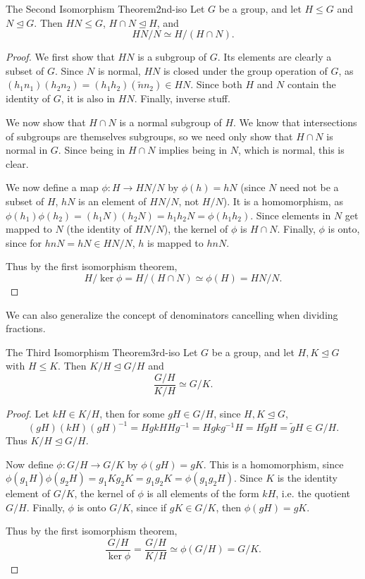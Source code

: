\documentclass[10pt]{report}
\begin{document}
\begin{thrm}{The Second Isomorphism Theorem}{2nd-iso}
Let $G$ be a group, and let $H \leq G$ and $N \trianglelefteq G$. Then $HN \leq G$, $H \cap N \trianglelefteq H$, and
\[
	HN/N \simeq H/(H \cap N).
\] 
\end{thrm}
\begin{proof}
	We first show that $HN$ is a subgroup of $G$. Its elements are clearly a subset of $G$. Since $N$ is normal, $HN$ is closed under the group operation of $G$, as $(h_1n_1)(h_2n_2) = (h_1h_2)(\tilde{n}n_2) \in HN$. Since both $H$ and $N$ contain the identity of $G$, it is also in $HN$. Finally, {\color{red}inverse stuff.}

	We now show that $H \cap N$ is a normal subgroup of $H$. We know that intersections of subgroups are themselves subgroups, so we need only show that $H \cap N$ is normal in $G$. Since being in $H \cap N$ implies being in $N$, which is normal, this is clear.

	We now define a map $\phi:H \to HN/N$ by $\phi(h)=hN$ (since $N$ need not be a subset of $H$, $hN$ is an element of $HN/N$, not $H/N$). It is a homomorphism, as $\phi(h_1)\phi(h_2) = (h_1N)(h_2N)=h_1h_2N = \phi(h_1h_2)$. Since elements in $N$ get mapped to $N$ (the identity of $HN/N$), the kernel of $\phi$ is $H\cap N$. Finally, $\phi$ is onto, since for $hnN=hN \in HN/N$, $h$ is mapped to $hnN$.

	Thus by the first isomorphism theorem,
	\[
		H/\ker \phi = H/(H\cap N) \simeq \phi(H) = HN/N.
	\] 
\end{proof}

We can also generalize the concept of denominators cancelling when dividing fractions.

\begin{thrm}{The Third Isomorphism Theorem}{3rd-iso}
Let $G$ be a group, and let $H,K \trianglelefteq G$ with $H \leq K$. Then $K/H \trianglelefteq  G/H$ and
\[
\frac{G/H}{K/H} \simeq G/K.
\] 
\end{thrm}
\begin{proof}
Let $kH \in K/H$, then for some $gH \in G/H$, since $H,K \trianglelefteq G$,
\[
	(gH)(kH)(gH)^{-1} = Hg kH Hg^{-1} = Hgkg^{-1}H = H\tilde{g}H = \tilde{g}H \in G/H.
\] Thus $K/H \trianglelefteq G/H$.

Now define $\phi:G/H \to G/K$ by $\phi(gH) = gK$. This is a homomorphism, since $\phi(g_1H)\phi(g_2H) = g_1Kg_2K = g_1g_2K = \phi(g_1g_2H)$. Since $K$ is the identity element of $G/K$, the kernel of $\phi$ is all elements of the form $kH$, i.e. the quotient $G/H$. Finally, $\phi$ is onto $G/K$, since if $gK \in G/K$, then $\phi(gH) = gK$.

Thus by the first isomorphism theorem,
\[
	\frac{G/H}{\ker \phi} = \frac{G/H}{K/H} \simeq \phi(G/H) = G/K.
\] 
\end{proof}
\end{document}
